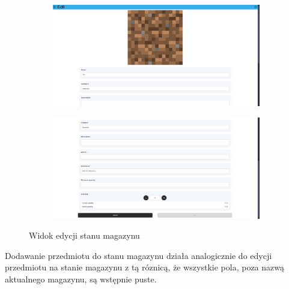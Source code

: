 \documentclass[../main.tex]{subfiles}
\begin{document}
            \begin{figure}[H]
                \begin{subfigure}{.49\textwidth}
                    \centering
                    \includegraphics[width=\getImageWidth]{images/app-desktop/app-stock-edit1-desktop.png}
                    \label{fig:app-stock-edit1-desktop}
                \end{subfigure}
                \begin{subfigure}{.49\textwidth}
                    \centering
                    \includegraphics[width=\getImageWidth]{images/app-desktop/app-stock-edit2-desktop.png}
                    \label{fig:app-stock-edit2-desktop}
                \end{subfigure}
                \caption{Widok edycji stanu magazynu}
                \label{fig:app-stock-edit-desktop}
            \end{figure}
            Dodawanie przedmiotu do stanu magazynu działa analogicznie do edycji przedmiotu na stanie magazynu z tą róznicą, że wszystkie pola, poza nazwą aktualnego magazynu, są wstępnie puste.
\end{document}
